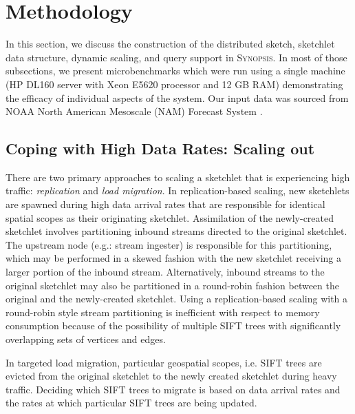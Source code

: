\section{Methodology}
\label{sec:methodology}
In this section, we discuss the construction of the distributed sketch, sketchlet data structure, dynamic scaling, and query support in \textsc{Synopsis}. In most of those subsections, we present microbenchmarks which were run using a single machine (HP DL160 server with Xeon E5620 processor and 12 GB RAM) demonstrating the efficacy of individual aspects of the system. Our input data was sourced from NOAA North American Mesoscale (NAM) Forecast System \cite{noaa_nam}.







%

\subsection{Coping with High Data Rates: Scaling out}
\label{subsec:scaling-out}
%
There are two primary approaches to scaling a sketchlet that is experiencing high traffic: \emph{replication} and \emph{load migration}. In replication-based scaling, new sketchlets are spawned during high data arrival rates that are responsible for identical spatial scopes as their originating sketchlet. Assimilation of the newly-created sketchlet involves partitioning inbound streams directed to the original sketchlet. The upstream node (e.g.: stream ingester) is responsible for this partitioning, which may be performed in a skewed fashion with the new sketchlet receiving a larger portion of the inbound stream. Alternatively, inbound streams to the original sketchlet may also be partitioned in a round-robin fashion between the original and the newly-created sketchlet.
Using a replication-based scaling with a round-robin style stream partitioning is inefficient with respect to memory consumption because of the possibility of multiple SIFT trees with significantly overlapping sets of vertices and edges.

In targeted load migration, particular geospatial scopes, i.e. SIFT trees are evicted from the original sketchlet to the newly created sketchlet during heavy traffic. Deciding which SIFT trees to migrate is based on data arrival rates and the rates at which particular SIFT trees are being updated.

